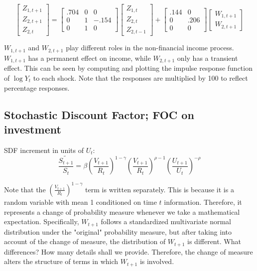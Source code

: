 \documentclass{article}
\theoremstyle{exampstyle}
\begin{document}
\begin{equation}\label{key}
	  \begin{bmatrix}Z_{1,t+1}\\Z_{2,t+1}\\Z_{2,t}\end{bmatrix} = \begin{bmatrix}.704 & 0 & 0 \\0 & 1 & -.154\\ 0 & 1 & 0\end{bmatrix} \begin{bmatrix}Z_{1,t}\\Z_{2,t}\\Z_{2,t-1}\end{bmatrix} + \begin{bmatrix}.144 & 0 \\0 & .206 \\ 0 & 0\end{bmatrix} \begin{bmatrix} W_{1,t+1}\\ W_{2,t+1}\end{bmatrix}
\end{equation}


$W_{1,t+1}$ and $W_{2,t+1}$ play different roles in the non-financial income process. $W_{1,t+1}$ has a permanent effect on income, while $W_{2,t+1}$ only has a transient effect. This can be seen by computing and plotting the impulse response function of $\log Y_t$ to each shock. Note that the responses are multiplied by 100 to reflect percentage responses.

\subsection{Stochastic Discount Factor; FOC on investment}
SDF increment in units of $U_t$:
\begin{equation}\label{key}
	 \widetilde{\frac{S_{t+1}}{S_t}} = \beta \left(\frac{V_{t+1}}{R_t}\right)^{1-\gamma} \left(\frac{V_{t+1}}{R_t}\right)^{\rho-1} \left(\frac{U_{t+1}}{U_t}\right)^{-\rho}
\end{equation}

Note that the $ \left(\frac{V_{t+1}}{R_t}\right)^{1-\gamma}$ term is written separately. This is because it is a random variable with mean 1 conditioned on time $t$ information. Therefore, it represents a change of probability measure whenever we take a mathematical expectation. Specifically, $W_{t+1}$  follows a standardized multivariate  normal distribution under the "original" probability measure, but after taking into account of the change of measure, the distribution of $W_{t+1}$ is different. What differences? How many details shall we provide. Therefore, the change of measure alters the structure of terms in which $W_{t+1}$ is involved.
\end{document}
